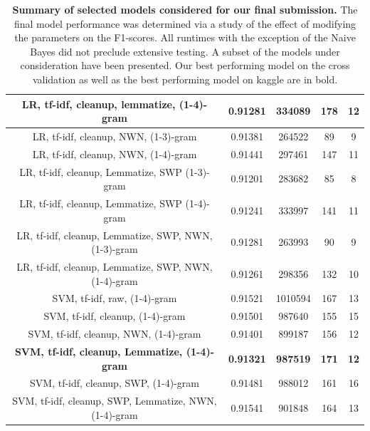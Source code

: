 \documentclass{amsart}
\theoremstyle{definition}
\theoremstyle{remark}
\numberwithin{equation}{section}
\begin{document}
\begin{center}
\begin{table}
\begin{tabular}{|| c | c | c | c | c ||}
			\hline
			LR, tf-idf, cleanup, lemmatize, (1-4)-gram & 0.91281 & 334089 & 178 & 12 \\
			\hline
			LR, tf-idf, cleanup, NWN, (1-3)-gram & 0.91381 & 264522 & 89 & 9\\
			\hline
			LR, tf-idf, cleanup, NWN, (1-4)-gram & 0.91441 & 297461 & 147 & 11\\
			\hline
			LR, tf-idf, cleanup, Lemmatize, SWP (1-3)-gram & 0.91201 & 283682 & 85 & 8 \\
			\hline
			LR, tf-idf, cleanup, Lemmatize, SWP (1-4)-gram & 0.91241 & 333997 & 141 & 11\\
			\hline
			LR, tf-idf, cleanup, Lemmatize, SWP, NWN, (1-3)-gram & 0.91281 & 263993 & 90 & 9 \\
			\hline
			LR, tf-idf, cleanup, Lemmatize, SWP, NWN, (1-4)-gram & 0.91261 & 298356 & 132 & 10\\
			\hline
			SVM, tf-idf, raw, (1-4)-gram & 0.91521 & 1010594 & 167 & 13 \\
			\hline
			SVM, tf-idf, cleanup, (1-4)-gram & 0.91501 & 987640 & 155 & 15 \\
			\hline
			SVM, tf-idf, cleanup, NWN, (1-4)-gram & 0.91401 & 899187 & 156 & 12\\
			\hline
			\textbf{SVM, tf-idf, cleanup, Lemmatize, (1-4)-gram} & \textbf{0.91321} & \textbf{987519} & \textbf{171} & \textbf{12}\\
			\hline
			SVM, tf-idf, cleanup, SWP, (1-4)-gram & 0.91481 & 988012 & 161 & 16\\
			\hline
			SVM, tf-idf, cleanup, SWP, Lemmatize, NWN, (1-4)-gram & 0.91541 & 901848 & 164 & 13\\
			\hline\hline
		\end{tabular}
		\caption*{\textbf{Summary of selected models considered for our final submission.} The final model performance was determined via a study of the effect of modifying the parameters on the F1-scores.  All runtimes with the exception of the Naive Bayes did not preclude extensive testing.  A subset of the models under consideration have been presented.  Our best performing model on the cross validation as well as the best performing model on kaggle are in bold.}
	\end{table}
\end{center}
\end{document}
